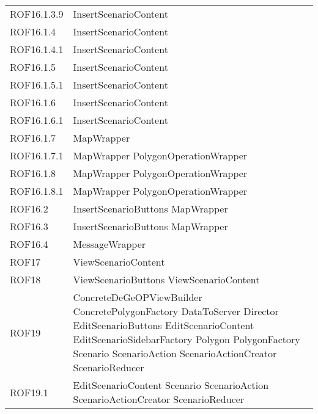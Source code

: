 \begin{longtable}{p{2.5cm}!{\VRule[1pt]}p{5cm}}
		ROF16.1.3.9 & InsertScenarioContent\\
		ROF16.1.4 & InsertScenarioContent\\
		ROF16.1.4.1 & InsertScenarioContent\\
		ROF16.1.5 & InsertScenarioContent\\
		ROF16.1.5.1 & InsertScenarioContent\\
		ROF16.1.6 & InsertScenarioContent\\
		ROF16.1.6.1 & InsertScenarioContent\\
		ROF16.1.7 & MapWrapper\\
		ROF16.1.7.1 & MapWrapper \newline PolygonOperationWrapper\\
		ROF16.1.8 & MapWrapper \newline PolygonOperationWrapper\\
		ROF16.1.8.1 & MapWrapper \newline PolygonOperationWrapper\\
		ROF16.2 & InsertScenarioButtons \newline MapWrapper\\
		ROF16.3 & InsertScenarioButtons \newline MapWrapper\\
		ROF16.4 & MessageWrapper\\
		ROF17 & ViewScenarioContent\\
		ROF18 & ViewScenarioButtons \newline ViewScenarioContent\\
		ROF19 & ConcreteDeGeOPViewBuilder \newline ConcretePolygonFactory \newline DataToServer \newline Director \newline EditScenarioButtons \newline EditScenarioContent \newline EditScenarioSidebarFactory \newline Polygon \newline PolygonFactory \newline Scenario \newline ScenarioAction \newline ScenarioActionCreator \newline ScenarioReducer\\
		ROF19.1 & EditScenarioContent \newline Scenario \newline ScenarioAction \newline ScenarioActionCreator \newline ScenarioReducer\\

\end{longtable}
